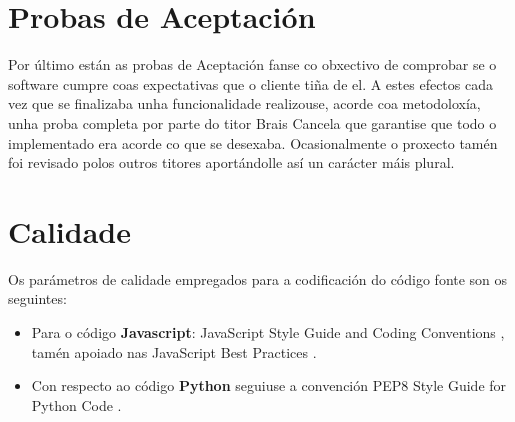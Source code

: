\section{Probas de Aceptación}
    Por último están as probas de Aceptación fanse co obxectivo de comprobar se o software cumpre
    coas expectativas que o cliente tiña de el. A estes efectos cada vez que se finalizaba unha 
    funcionalidade realizouse, acorde coa metodoloxía, unha proba completa por parte do titor Brais 
    Cancela que garantise que todo o implementado era acorde co que se desexaba. Ocasionalmente o 
    proxecto tamén foi revisado polos outros titores aportándolle así un carácter máis plural.
    

\section{Calidade}
	Os parámetros de calidade empregados para a codificación do código fonte son os seguintes:
    \begin{itemize}
     \item Para o código \textbf{Javascript}: JavaScript Style Guide and Coding Conventions 
     \cite{javascript-style-guide}, tamén apoiado nas JavaScript Best Practices 
     \cite{javascript-best-practices}.
     \item Con respecto ao código \textbf{Python} seguiuse a convención PEP8 Style Guide for Python
        Code \cite{pepe8-style-guide}.
    \end{itemize}